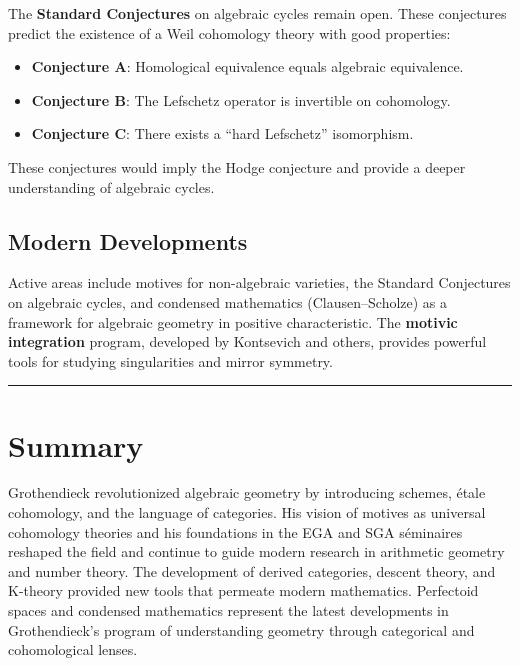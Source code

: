 The \textbf{Standard Conjectures} on algebraic cycles remain open. These
conjectures predict the existence of a Weil cohomology theory with good
properties:
\begin{itemize}
\item \textbf{Conjecture A}: Homological equivalence equals algebraic equivalence.
\item \textbf{Conjecture B}: The Lefschetz operator is invertible on cohomology.
\item \textbf{Conjecture C}: There exists a ``hard Lefschetz'' isomorphism.
\end{itemize}
These conjectures would imply the Hodge conjecture and provide a deeper
understanding of algebraic cycles.

\subsection*{Modern Developments}

Active areas include motives for non-algebraic varieties, the Standard
Conjectures on algebraic cycles, and condensed mathematics (Clausen--Scholze)
as a framework for algebraic geometry in positive characteristic. The
\textbf{motivic integration} program, developed by Kontsevich and others,
provides powerful tools for studying singularities and mirror symmetry.

\begin{center}\rule{0.5\linewidth}{0.5pt}\end{center}

\section*{Summary}

Grothendieck revolutionized algebraic geometry by introducing schemes, étale
cohomology, and the language of categories. His vision of motives as universal
cohomology theories and his foundations in the EGA and SGA séminaires reshaped the
field and continue to guide modern research in arithmetic geometry and number
theory. The development of derived categories, descent theory, and K-theory
provided new tools that permeate modern mathematics. Perfectoid spaces and
condensed mathematics represent the latest developments in Grothendieck's
program of understanding geometry through categorical and cohomological lenses.
